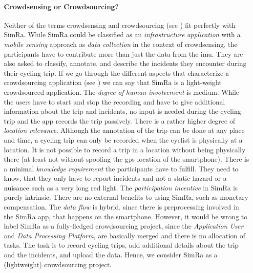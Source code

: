 \paragraph{Crowdsensing or Crowdsourcing?}
Neither of the terms crowdsensing and crowdsourcing (see ) fit perfectly with SimRa.
While SimRa could be classified as an \textit{infrastructure application} with a \textit{mobile sensing} approach as \textit{data collection} in the context of crowdsensing, the participants have to contribute more than just the data from the \ac{imu}.
They are also asked to classify, annotate, and describe the incidents they encounter during their cycling trip.
If we go through the different aspects that characterize a crowdsourcing application (see ) we can say that SimRa is a light-weight crowdsourced application.
The \textit{degree of human involvement} is medium.
While the users have to start and stop the recording and have to give additional information about the trip and incidents, no input is needed during the cycling trip and the app records the trip passively.
There is a rather higher degree of \textit{location relevance}.
Although the annotation of the trip can be done at any place and time, a cycling trip can only be recorded when the cyclist is physically at a location.
It is not possible to record a trip in a location without being physically there (at least not without spoofing the \ac{gps} location of the smartphone).
There is a minimal \textit{knowledge requirement} the participants have to fulfill.
They need to know, that they only have to report incidents and not a static hazard or a nuisance such as a very long red light.
The \textit{participation incentive} in SimRa is purely intrinsic.
There are no external benefits to using SimRa, such as monetary compensation.
The \textit{data flow} is hybrid, since there is preprocessing involved in the SimRa app, that happens on the smartphone.
However, it would be wrong to label SimRa as a fully-fledged crowdsourcing project, since the \textit{Application User} and \textit{Data Processing Platform}, are basically merged and there is no allocation of tasks.
The task is to record cycling trips, add additional details about the trip and the incidents, and upload the data.
Hence, we consider SimRa as a (lightweight) crowdsourcing project.

